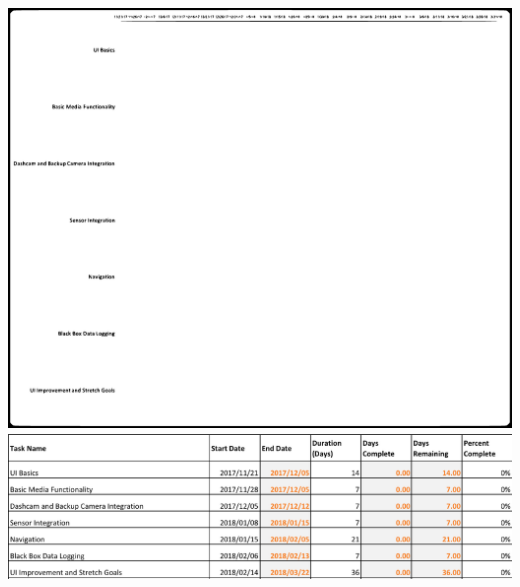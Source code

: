 \documentclass[onecolumn, draftclsnofoot,10pt, compsoc]{IEEEtran}
\begin{document}
\includegraphics[width=\textwidth ]{gantt.eps}
\includegraphics[width=\textwidth]{tablegantt.eps}
\end{document}

